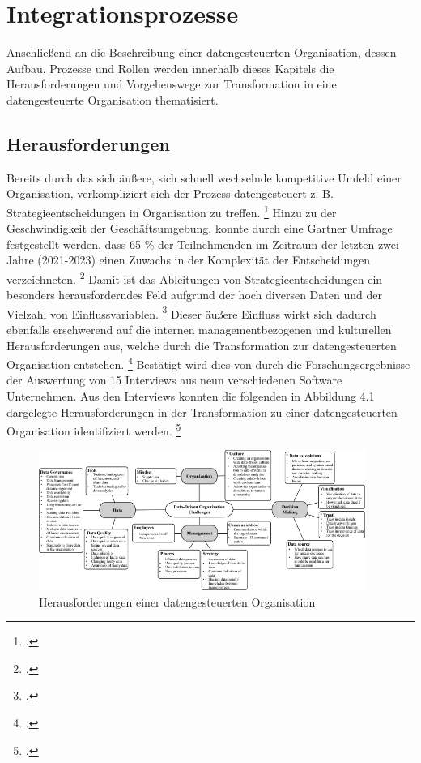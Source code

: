 \chapter[Integrationsprozesse]{Integrationsprozesse}

Anschließend an die Beschreibung einer datengesteuerten Organisation, dessen Aufbau, Prozesse und Rollen werden innerhalb dieses Kapitels die Herausforderungen und Vorgehenswege zur Transformation in eine datengesteuerte Organisation thematisiert.

\section{Herausforderungen}

Bereits durch das sich äußere, sich schnell wechselnde kompetitive Umfeld einer Organisation, verkompliziert sich der Prozess datengesteuert z. B. Strategieentscheidungen in Organisation zu treffen. \footcite[Vgl.][S. 2]{Pratt.2023} 
Hinzu zu der Geschwindigkeit der Geschäftsumgebung, konnte durch eine Gartner Umfrage festgestellt werden, dass 65 \% der Teilnehmenden im Zeitraum der letzten zwei Jahre (2021-2023) einen Zuwachs in der Komplexität der Entscheidungen verzeichneten. \footcite[Vgl.][S. 65]{Pratt.2023}
Damit ist das Ableitungen von Strategieentscheidungen ein besonders herausforderndes Feld aufgrund der hoch diversen Daten und der Vielzahl von Einflussvariablen. \footcite[Vgl.][S. 3]{Pratt.2023}
Dieser äußere Einfluss wirkt sich dadurch ebenfalls erschwerend auf die internen managementbezogenen und kulturellen Herausforderungen aus, welche durch die Transformation zur datengesteuerten Organisation entstehen. \footcite[Vgl.][S. 15]{Dalpiaz.2020}
Bestätigt wird dies von  durch die Forschungsergebnisse der Auswertung von 15 Interviews aus neun verschiedenen Software Unternehmen.
Aus den Interviews konnten die folgenden in Abbildung 4.1 dargelegte Herausforderungen in der Transformation zu einer datengesteuerten Organisation identifiziert werden. \footcite[][S. 9]{Dalpiaz.2020}

\begin{figure}[htb]
    \centering
    \includegraphics[width=0.95\textwidth]{graphics/DDO challenges.png}
    \caption{Herausforderungen einer datengesteuerten Organisation}
    \label{fig:DDOs challenges}
\end{figure}

